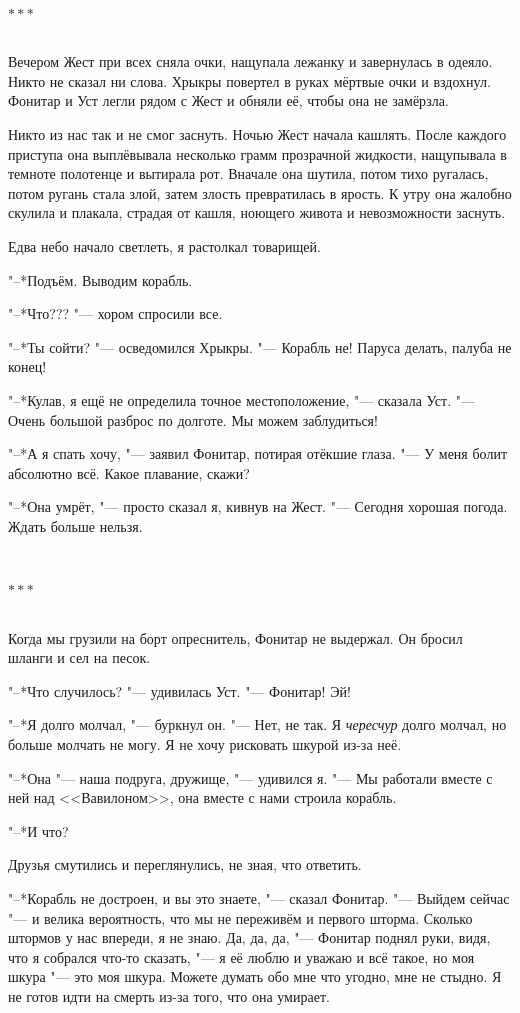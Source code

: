 \documentclass[a4paper,12pt,fleqn]{book}
\newcommand{\razd}{~\\{\centering\Large\bfseries$\ast \ast \ast$\par}~\\}
\begin{document}
\razd

Вечером Жест при всех сняла очки, нащупала лежанку и завернулась в одеяло.
Никто не сказал ни слова.
Хрыкры повертел в руках мёртвые очки и вздохнул.
Фонитар и Уст легли рядом с Жест и обняли её, чтобы она не замёрзла.

Никто из нас так и не смог заснуть.
Ночью Жест начала кашлять.
После каждого приступа она выплёвывала несколько грамм прозрачной жидкости, нащупывала в темноте полотенце и вытирала рот.
Вначале она шутила, потом тихо ругалась, потом ругань стала злой, затем злость превратилась в ярость.
К утру она жалобно скулила и плакала, страдая от кашля, ноющего живота и невозможности заснуть.

Едва небо начало светлеть, я растолкал товарищей.

"--*Подъём.
Выводим корабль.

"--*Что??? "--- хором спросили все.

"--*Ты сойти? "--- осведомился Хрыкры.
"--- Корабль не!
Паруса делать, палуба не конец!

"--*Кулав, я ещё не определила точное местоположение, "--- сказала Уст.
"--- Очень большой разброс по долготе.
Мы можем заблудиться!

"--*А я спать хочу, "--- заявил Фонитар, потирая отёкшие глаза.
"--- У меня болит абсолютно всё.
Какое плавание, скажи?

"--*Она умрёт, "--- просто сказал я, кивнув на Жест.
"--- Сегодня хорошая погода.
Ждать больше нельзя.

\razd

Когда мы грузили на борт опреснитель, Фонитар не выдержал.
Он бросил шланги и сел на песок.

"--*Что случилось? "--- удивилась Уст.
"--- Фонитар!
Эй!

"--*Я долго молчал, "--- буркнул он.
"--- Нет, не так.
Я \emph{чересчур} долго молчал, но больше молчать не могу.
Я не хочу рисковать шкурой из-за неё.

"--*Она "--- наша подруга, дружище, "--- удивился я.
"--- Мы работали вместе с ней над <<Вавилоном>>, она вместе с нами строила корабль.

"--*И что?

Друзья смутились и переглянулись, не зная, что ответить.

"--*Корабль не достроен, и вы это знаете, "--- сказал Фонитар.
"--- Выйдем сейчас "--- и велика вероятность, что мы не переживём и первого шторма.
Сколько штормов у нас впереди, я не знаю.
Да, да, да, "--- Фонитар поднял руки, видя, что я собрался что-то сказать, "--- я её люблю и уважаю и всё такое, но моя шкура "--- это моя шкура.
Можете думать обо мне что угодно, мне не стыдно.
Я не готов идти на смерть из-за того, что она умирает.
\end{document}
